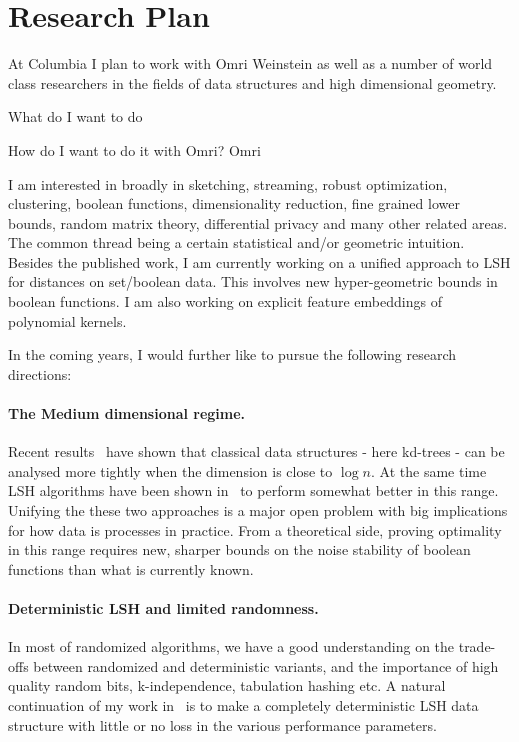 \documentclass[10pt]{article}
\begin{document}


\section*{Research Plan}

At Columbia I plan to work with Omri Weinstein as well as a number of world class researchers in the fields of data structures and high dimensional geometry.

What do I want to do

How do I want to do it with Omri?
Omri 

I am interested in broadly in sketching, streaming, robust optimization, clustering, boolean functions, dimensionality reduction, fine grained lower bounds, random matrix theory, differential privacy and many other related areas.
The common thread being a certain statistical and/or geometric intuition.
Besides the published work, I am currently working on a unified approach to LSH for distances on set/boolean data. This involves new hyper-geometric bounds in boolean functions. I am also working on explicit feature embeddings of polynomial kernels.

In the coming years, I would further like to pursue the following research directions:

\paragraph{The Medium dimensional regime.} Recent results~\cite{DBLP:conf/compgeom/Chan17a} have shown that classical data structures - here kd-trees - can be analysed more tightly when the dimension is close to $\log n$.
At the same time LSH algorithms have been shown in~\cite{becker2016new} to perform somewhat better in this range.
Unifying the these two approaches is a major open problem with big implications for how data is processes in practice.
From a theoretical side, proving optimality in this range requires new, sharper bounds on the noise stability of boolean functions than what is currently known.

\paragraph{Deterministic LSH and limited randomness.} In most of randomized algorithms, we have a good understanding on the trade-offs between randomized and deterministic variants, and the importance of high quality random bits, k-independence, tabulation hashing etc.
A natural continuation of my work in~\cite{ahle2017optimal} is to make a completely deterministic LSH data structure with little or no loss in the various performance parameters.
\end{document}
